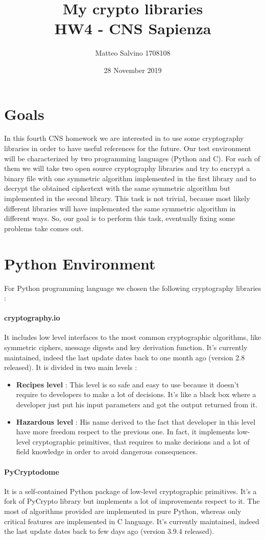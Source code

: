 \documentclass[11pt]{article}
\title{My crypto libraries \\\large HW4 - CNS Sapienza}
\author{Matteo Salvino 1708108}
\date{28 November 2019}
\begin{document}
\maketitle

\section{Goals}
In this fourth CNS homework we are interested in to use some cryptography libraries in order to have useful references for the future. Our test environment will be characterized  by two programming languages (Python and C). For each of them we will take two open source cryptography libraries and try to encrypt a binary file with one symmetric algorithm implemented in the first library and to decrypt the obtained ciphertext with the same symmetric algorithm but implemented in the second library. This task is not trivial, because most likely different libraries will have implemented the same symmetric algorithm in different ways. So, our goal is to perform this task, eventually fixing some problems take comes out.
\section{Python Environment}
For Python programming language we chosen the following cryptography libraries : 
\paragraph{cryptography.io} It includes low level interfaces to the most common cryptographic algorithms, like symmetric ciphers, message digests and key derivation function. It's currently maintained, indeed the last update dates back to one month ago (version 2.8 released). It is divided in two main levels :
\begin{itemize}
\item \textbf{Recipes level} : This level is so safe and easy to use because it doesn't require to developers to make a lot of decisions. It's like a black box where a developer just put his input parameters and got the output returned from it.
\item \textbf{Hazardous level} : His name derived to the fact that developer in this level have more freedom respect to the previous one. In fact, it implements low-level cryptographic primitives, that requires to make decisions and a lot of field knowledge in order to avoid dangerous consequences.
\end{itemize}
\paragraph{PyCryptodome} It is a self-contained Python package of low-level cryptographic primitives. It's a fork of PyCrypto library but implements a lot of improvements respect to it. The most of algorithms provided are implemented in pure Python, whereas only critical features are implemented in C language. It's currently maintained, indeed the last update dates back to few days ago (version 3.9.4 released).
\end{document}

